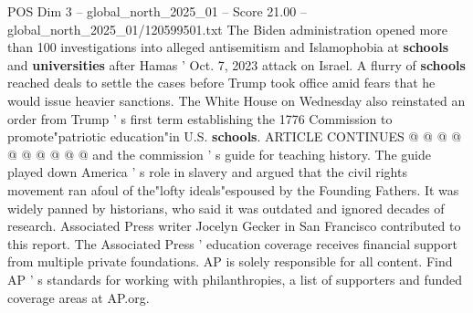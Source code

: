 \begin{textsample}{POS Dim 3 – global\_north\_2025\_01 – Score 21.00 – global\_north\_2025\_01/120599501.txt}
The Biden administration opened more than 100 investigations into alleged antisemitism and Islamophobia at \textbf{schools} and \textbf{universities} after Hamas ' Oct. 7, 2023 attack on Israel.
A flurry of \textbf{schools} reached deals to settle the cases before Trump took office amid fears that he would issue heavier sanctions.
The White House on Wednesday also reinstated an order from Trump ' s first term establishing the 1776 Commission to promote"patriotic education"in U.S. \textbf{schools}.
ARTICLE CONTINUES @ @ @ @ @ @ @ @ @ @ and the commission ' s guide for teaching history.
The guide played down America ' s role in slavery and argued that the civil rights movement ran afoul of the"lofty ideals"espoused by the Founding Fathers.
It was widely panned by historians, who said it was outdated and ignored decades of research.
Associated Press writer Jocelyn Gecker in San Francisco contributed to this report.
The Associated Press ' education coverage receives financial support from multiple private foundations.
AP is solely responsible for all content.
Find AP ' s standards for working with philanthropies, a list of supporters and funded coverage areas at AP.org.

\end{textsample}
